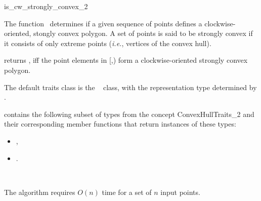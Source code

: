 

\begin{ccRefFunction}{is_cw_strongly_convex_2}  

\ccDefinition
  
The function \ccRefName\ determines if a given sequence of points defines
a clockwise-oriented, stongly convex polygon.  
A set of points is said to be strongly convex %
 if it consists of only extreme points
(\textit{i.e.}, vertices of the convex hull).



           {returns , iff the point elements in 
            [,)
            form a clockwise-oriented strongly convex polygon.
           }

The default traits class  is the \cgal\ 
 class,
with the representation type determined by .


 contains the following subset of types from
the concept ConvexHullTraits\_2 and their corresponding member
functions that return instances of these types:
            \begin{itemize}
                \item {}, 
                \item {}.
            \end{itemize}


\ccSeeAlso

 \\

\ccImplementation
The algorithm requires $O(n)$ time for a set of $n$ input points.

\end{ccRefFunction}


